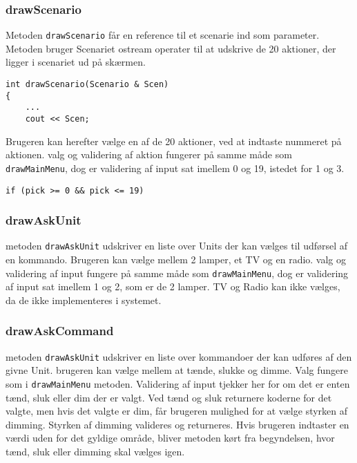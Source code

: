 \subsubsection{drawScenario}
Metoden \texttt{drawScenario} får en reference til et scenarie ind som parameter. Metoden bruger Scenariet ostream operater til at udskrive de 20 aktioner, der ligger i scenariet ud på skærmen.
\begin{lstlisting}
int drawScenario(Scenario & Scen) 
{	
	...
	cout << Scen;
\end{lstlisting}


Brugeren kan herefter vælge en af de 20 aktioner, ved at indtaste nummeret på aktionen. valg og validering af aktion fungerer på samme måde som \texttt{drawMainMenu}, dog er validering af input sat imellem 0 og 19, istedet for 1 og 3.
\begin{lstlisting}
if (pick >= 0 && pick <= 19)
\end{lstlisting}


\subsubsection{drawAskUnit}
metoden \texttt{drawAskUnit} udskriver en liste over Units der kan vælges til udførsel af en kommando. Brugeren kan vælge mellem 2 lamper, et TV og en radio. valg og validering af input fungere på samme måde som \texttt{drawMainMenu}, dog er validering af input sat imellem 1 og 2, som er de 2 lamper. TV og Radio kan ikke vælges, da de ikke implementeres i systemet.

\subsubsection{drawAskCommand}
metoden \texttt{drawAskUnit} udskriver en liste over kommandoer der kan udføres af den givne Unit. brugeren kan vælge mellem at tænde, slukke og dimme. Valg fungere som i \texttt{drawMainMenu} metoden. Validering af input tjekker her for om det er enten tænd, sluk eller dim der er valgt. Ved tænd og sluk returnere koderne for det valgte, men hvis det valgte er dim, får brugeren mulighed for at vælge styrken af dimming. Styrken af dimming valideres og returneres. Hvis brugeren indtaster en værdi uden for det gyldige område, bliver metoden kørt fra begyndelsen, hvor tænd, sluk eller dimming skal vælges igen.



